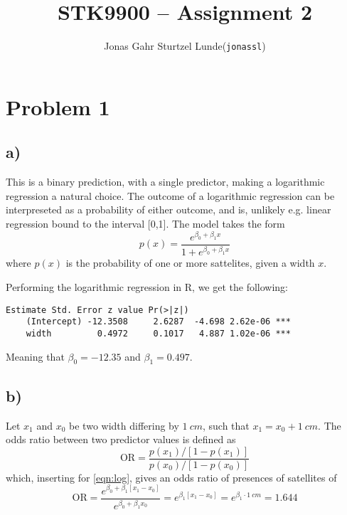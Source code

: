 \documentclass[a4paper, twocolumn]{article}
\renewcommand{\exp}{e^}
\begin{document}
\title{STK9900 -- Assignment 2}
\author{
    \begin{tabular}{r l}
        Jonas Gahr Sturtzel Lunde & (\texttt{jonassl})
    \end{tabular}}
\maketitle

\section*{Problem 1}
\subsection*{a)}
This is a binary prediction, with a single predictor, making a logarithmic regression a natural choice. The outcome of a logarithmic regression can be interpreseted as a probability of either outcome, and is, unlikely e.g. linear regression bound to the interval [0,1]. The model takes the form
\begin{equation}\label{eqn:log}
    p(x) = \frac{\exp{\beta_0 + \beta_1x}}{1 + \exp{\beta_0 + \beta_1x}}
\end{equation}
where $p(x)$ is the probability of one or more sattelites, given a width $x$.

Performing the logarithmic regression in R, we get the following:
\begin{Verbatim}[fontsize=\scriptsize]
                Estimate Std. Error z value Pr(>|z|)    
    (Intercept) -12.3508     2.6287  -4.698 2.62e-06 ***
    width         0.4972     0.1017   4.887 1.02e-06 ***
\end{Verbatim}

Meaning that $\beta_0 = -12.35$ and $\beta_1 = 0.497$.

\subsection*{b)}
Let $x_1$ and $x_0$ be two width differing by $\SI{1}{cm}$, such that $x_1 = x_0 + \SI{1}{cm}$. The odds ratio between two predictor values is defined as
\begin{equation}
    \mathrm{OR} = \frac{p(x_1)/[1-p(x_1)]}{p(x_0)/[1 - p(x_0)]}
\end{equation}
which, inserting for \ref{eqn:log}, gives an odds ratio of presences of satellites of
\begin{equation}
    \mathrm{OR} = \frac{\exp{\beta_0 + \beta_1[x_1 - x_0]}}{\exp{\beta_0 + \beta_1 x_0}} = \exp{\beta_1[x_1 - x_0]} = \exp{\beta_1 \cdot \SI{1}{cm}} = 1.644
\end{equation}
\end{document}
